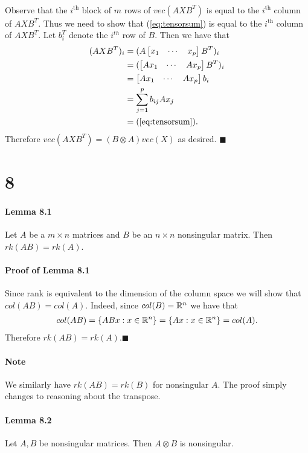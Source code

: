 \documentclass[letterpaper,12pt,oneside,onecolumn]{article}
\begin{document}
\paragraph{}
Observe that the $i^\text{th}$ block of $m$ rows of $vec(AXB^T)$ is equal to the $i^\text{th}$ column of $AXB^T$. Thus we need to show that (\ref{eq:tensorsum}) is equal to the $i^\text{th}$ column of $AXB^T$. Let $b_i^T$ denote the $i^{th}$ row of $B$. Then we have that
\begin{align*}
(AXB^T)_i &= (A\begin{bmatrix} x_1 & \cdots & x_p\end{bmatrix}B^T)_i \\
&=(\begin{bmatrix} Ax_1 &\cdots & Ax_p \end{bmatrix} B^T)_i \\
&= \begin{bmatrix} Ax_1 &\cdots & Ax_p \end{bmatrix} b_i \\
&= \sum_{j=1}^p b_{ij}Ax_j \\
&= (\ref{eq:tensorsum}). 
\end{align*}
Therefore $vec(AXB^T) = (B \otimes A)vec(X)$ as desired. $\blacksquare$
\section*{8}
\paragraph{Lemma 8.1}
Let $A$ be a $m\times n$ matrices and $B$ be an $n \times n$ nonsingular matrix. Then $rk(AB) = rk(A)$.
\paragraph{Proof of Lemma 8.1}
Since rank is equivalent to the dimension of the column space we will show that $col(AB) = col(A)$. Indeed, since $col(B) = \mathbb{R}^n$ we have that
\begin{align*}
col(AB) = \{ABx : x \in \mathbb{R}^n\} = \{Ax : x \in \mathbb{R}^n\} = col(A).
\end{align*}
Therefore $rk(AB) = rk(A)$.$\blacksquare$
\paragraph{Note}
We similarly have $rk(AB) = rk(B)$ for nonsingular $A$. The proof simply changes to reasoning about the transpose.
\paragraph{Lemma 8.2}
Let $A,B$ be nonsingular matrices. Then $A \otimes B$ is nonsingular.
\end{document}
